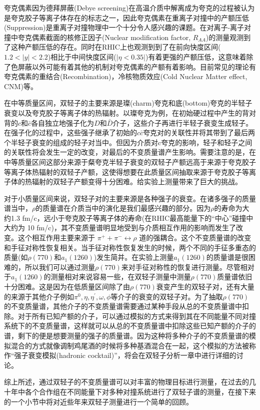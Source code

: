 夸克偶素因为德拜屏蔽(Debye screening)在高温介质中解离成为夸克的过程被认为是夸克胶子等离子体存在的标志之一，因此夸克偶素在重离子对撞中的产额压低(Suppression)是重离子对撞物理中一个十分令人感兴趣的课题。在对离子-离子对撞中夸克偶素截面的核修正因子(Nuclear modification factor, $R_{AA}$)的测量观测到了这种产额压低的存在。同时在RHIC上也观测到到了在前向快度区间($1.2 < |y| < 2.2$)相比于中间快度区间($|\eta <0.35|$)有着更强的产额压低，这意味着除了色屏蔽以外可能有着其他的机制对夸克偶素的产额有着影响。目前常见的理论有夸克偶素的重结合(Recombination)，冷核物质效应(Cold Nuclear Matter effect, CNM)等。

在中等质量区间，双轻子的主要来源是璨(charm)夸克和底(bottom)夸克的半轻子衰变以及夸克胶子等离子体的热辐射。以璨夸克为例，在初始硬过程中产生的背对背的$c$和$\bar{c}$各自独立地强子化为$D$和$\bar{D}$介子，这些介子再进行半轻子衰变生成轻子。在强子化的过程中，这些强子继承了初始的$c\bar{c}$夸克对的关联性并将其带到了最后两个半轻子衰变的组成的轻子对当中。但因为介质对c夸克的影响，轻子和轻子之间的关联性将会发生一定的改变，对最后的不变质量谱产生影响。需要注意的是，在中等质量区间这部分来源于粲夸克半轻子衰变的双轻子产额远高于来源于夸克胶子等离子体热辐射的双轻子产额，这使得想要在此质量区间抽取来源于夸克胶子等离子体的热辐射的双轻子产额变得十分困难。给实验上测量带来了巨大的挑战。

对于小质量区间来说，双轻子对的主要来源是各种强子的衰变。在诸多强子的质量谱当中，$\rho$的质量谱在介质当中的演化是我们最感兴趣的部分。因为$\rho$的寿命为大约1.3 fm/c，远小于夸克胶子等离子体的寿命(在RHIC最高能量下的“中心”碰撞中大约为 10 fm/c)，其不变质量谱明显地受到与介质相互作用的影响而发生了改变。这个相互作用主要来源于 $\pi^+ + \pi^- \leftrightarrow \rho$ 道的强耦合。这个不变质量谱的改变和手征对称性恢复相关。当手征对称性恢复发生的时候，两个不同的手征多重态的质量(如$\rho(770)$和$a_1(1260)$)发生简并。在实验上测量$a_1(1260)$的质量谱是很困难的，所以我们可以通过测量$\rho(770)$来对手征对称性的恢复进行测量。尽管相对于$a_1(1260)$的测量相对来说容易一些，在双轻子测量中测量$\rho(770)$质量谱依旧十分困难。这是因为在低质量区间除了由$\rho(770)$衰变产生的双轻子对，还有大量的来源于其他介子例如$\pi^0, \eta, \eta^\prime, \omega, \phi$等介子的衰变的双轻子对。为了抽取$\rho(770)$的不变质量谱，其他介子的不变质量谱需要通过某种手段从总的不变质量谱中扣除。对于所有已知产额的介子，可以通过模拟的方式来得到其在不同能量不同对撞系统下的不变质量谱，这样就可以从总的不变质量谱中扣除这些已知产额的介子的谱，剩下的便是想要测量的强子的质量谱。因为这种将多种介子的不变质量谱的模拟混合的方式就像调制鸡尾酒的时候将多种基酒混合在一起，这个模拟的方法被称作“强子衰变模拟(hadronic cocktail)”，将会在双轻子分析一章中进行详细的讨论。

综上所述，通过双轻子的不变质量谱可以对丰富的物理目标进行测量，在过去的几十年中各个合作组在不同能量下对多种对撞系统进行了双轻子谱的测量，在接下来的一个小节中将对近些年来双轻子测量进行一个简单的回顾。